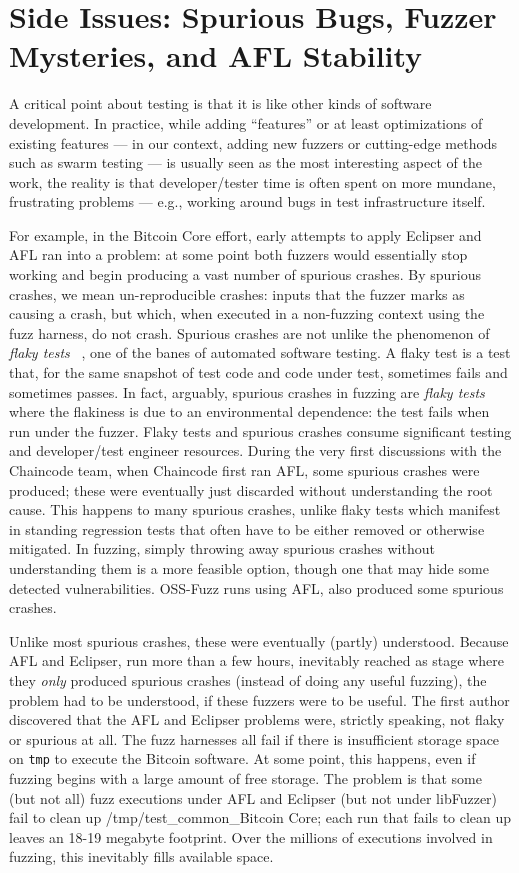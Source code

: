 \section{Side Issues: Spurious Bugs, Fuzzer Mysteries, and AFL Stability}

A critical point about testing is that it is like other kinds of
software development.  In practice, while adding ``features'' or at
least optimizations of existing features --- in our context, adding
new fuzzers or cutting-edge methods such as swarm testing --- is
usually seen as the most interesting aspect of the work, the reality
is that developer/tester time is often spent on more mundane,
frustrating problems --- e.g., working around bugs in test
infrastructure itself.

For example, in the Bitcoin Core effort, early attempts to apply
Eclipser and AFL ran into a problem:  at some point both fuzzers would
essentially stop working and begin producing a vast number of spurious
crashes.  By spurious crashes, we mean un-reproducible crashes: inputs
that the fuzzer marks as causing a crash, but which, when executed in
a non-fuzzing context using the fuzz harness, do not crash.  Spurious
crashes are not unlike the phenomenon of \emph{flaky tests} ~\cite{flaky}, one of
the banes of automated software testing.  A flaky test is a test that, for the same
snapshot of test code and code under test, sometimes
fails and sometimes passes.  In fact, arguably, spurious crashes in
fuzzing are \emph{flaky tests} where the flakiness is due to an
environmental dependence: the test fails when run under the fuzzer.
Flaky tests and spurious crashes consume significant testing and
developer/test engineer resources.  During the very first discussions
with the Chaincode team, when Chaincode first ran AFL, some spurious
crashes were produced; these were eventually just discarded without
understanding the root cause.  This happens to
many spurious crashes, unlike flaky tests which manifest in standing
regression tests that often have to be either removed or otherwise
mitigated.  In fuzzing, simply throwing away spurious crashes without
understanding them is a more feasible option, though one that may hide
some detected vulnerabilities.
OSS-Fuzz runs using AFL, also produced some spurious
crashes.

Unlike most spurious crashes, these were eventually (partly)
understood.  Because AFL and Eclipser, run more than a few hours,
inevitably reached as stage where they \emph{only} produced spurious
crashes (instead of doing any useful fuzzing), the problem had to be
understood, if these fuzzers were to be useful.
The first author discovered that the AFL and Eclipser problems were,
strictly speaking, not flaky or spurious at all.  The fuzz harnesses
all fail if there is insufficient storage space on {\tt tmp} to
execute the Bitcoin software.  At some point, this happens, even if
fuzzing begins with a large amount of free storage.  The problem is
that some (but not all) fuzz executions under AFL and Eclipser (but
not under libFuzzer) fail to
clean up {/tmp/test\_common\_Bitcoin Core}; each run that fails to
clean up leaves an 18-19 megabyte footprint.  Over the millions of
executions involved in fuzzing, this inevitably fills
available space.

